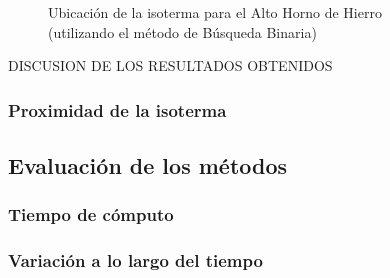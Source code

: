 \begin{figure}[H]
    \begin{center}
        \captionsetup{justification=centering}
        \caption{Ubicación de la isoterma para el Alto Horno de Hierro\\ (utilizando el método de Búsqueda Binaria)}
        \label{fig:isoterma_binaria_hierro_1}
    \end{center}
\end{figure}

DISCUSION DE LOS RESULTADOS OBTENIDOS

\subsubsection{Proximidad de la isoterma}


\subsection{Evaluación de los métodos}

\subsubsection{Tiempo de cómputo}

\subsubsection{Variación a lo largo del tiempo}
